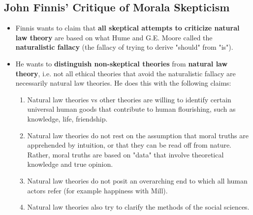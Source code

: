 \documentclass{article}
\begin{document}
    \subsection*{John Finnis' Critique of Morala Skepticism}
    \begin{itemize}
        \item Finnis wants to claim that \textbf{all skeptical attempts to criticize natural law theory} are based on what Hume and G.E. Moore called the \textbf{naturalistic fallacy} (the fallacy of trying to derive "should" from "is").
        \item He wants to \textbf{distinguish non-skeptical theories} from \textbf{natural law theory}, i.e. not all ethical theories that avoid the naturalistic fallacy are necessarily natural law theories. He does this with the following claims:
        \begin{enumerate}
            \item Natural law theories vs other theories are willing to identify certain universal human goods that contribute to human flourishing, such as knowledge, life, friendship.
            \item Natural law theories do not rest on the assumption that moral truths are apprehended by intuition, or that they can be read off from nature. Rather, moral truths are based on "data" that involve theoretical knowledge and true opinion.
            \item Natural law theories do not posit an overarching end to which all human actors refer (for example happiness with Mill).
            \item Natural law theories also try to clarify the methods of the social sciences.
        \end{enumerate}
    \end{itemize}
    
\end{document}
